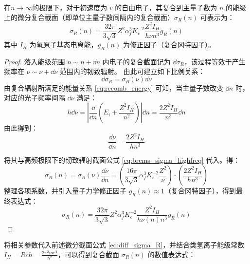 \begin{theorem}[微分复合辐射截面]
在$n\rightarrow \infty$的极限下，对于初速度为 $v$ 的自由电子，其复合到主量子数为 $n$ 的能级上的微分复合截面（即单位主量子数间隔内的复合截面）$\sigma_R(n)$ 可表示为：
\begin{equation}\label{eq:diff_sigma_R}
    \sigma_R(n) = \frac{32\pi}{3\sqrt{3}} Z^2 \alpha_f^3 K_e^{-2} \frac{Z^2 I_H}{h \nu n^3} g_R(n)
\end{equation}
其中 $I_H$ 为氢原子基态电离能，$g_R(n)$ 为修正因子（复合冈特因子）。
\end{theorem}

\begin{proof}
    落入能级范围 $n \sim n+\dd n$ 内电子的复合截面记为 $\dd \sigma_R$，该过程等效于产生频率在 $\nu \sim \nu+\dd \nu$ 范围内的韧致辐射。
由此可建立如下比例关系：
\begin{equation}
    \dd \sigma_R = \sigma_B(\nu) \dd \nu \nonumber
\end{equation}
由复合辐射所满足的能量关系 \eqref{eq:recomb_energy} 可知，当主量子数改变 $\dd n$ 时，对应的光子频率间隔 $\dd \nu$ 满足：
\begin{equation}
    h \dd \nu = \left| \frac{\dd}{\dd n} \left( E_i + \frac{Z^2 I_H}{n^2} \right) \right| \dd n = \frac{2 Z^2 I_H}{n^3} \dd n \nonumber
\end{equation}
由此得到：
\begin{equation}
    \frac{\dd \nu}{\dd n} = \frac{2 Z^2 I_H}{h n^3} \nonumber
\end{equation}

将其与高频极限下的韧致辐射截面公式 \eqref{eq:brems_sigma_highfreq} 代入。得：
\begin{equation}
    \sigma_R(n) = \sigma_B(\nu) \frac{\dd \nu}{\dd n} = \left( \frac{16\pi}{3\sqrt{3}} \alpha_f^3 K_e^{-2} \frac{Z^2}{\nu} \right) \cdot \left( \frac{2 Z^2 I_H}{h n^3} \right) \nonumber
\end{equation}
整理各项系数，并引入量子力学修正因子 $g_R(n) \approx 1$（复合冈特因子），得到最终表达式：
\begin{equation}
    \sigma_R(n) = \frac{32\pi}{3\sqrt{3}} Z^2 \alpha_f^3 K_e^{-2} \frac{Z^2 I_H}{h \nu(n) n^3} g_R(n)
\end{equation}
\end{proof}
将相关参数代入前述微分截面公式 \eqref{eq:diff_sigma_R}，并结合类氢离子能级常数 $I_H = Rch = \frac{2\pi^2 m e^4}{h^2}$，可以得到复合截面 $\sigma_R(n)$ 的数值表达式：

